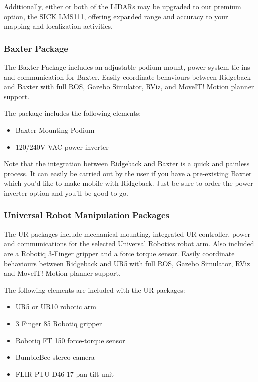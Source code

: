 \documentclass[]{clearpath-latex/clearpath-manual}
\begin{document}
Additionally, either or both of the LIDARs may be upgraded to our premium option, the SICK LMS111, offering expanded range and accuracy to your mapping and localization activities.

\subsubsection{Baxter Package}

The Baxter Package includes an adjustable podium mount, power system tie-ins and communication for Baxter. Easily coordinate behaviours between Ridgeback and Baxter with full ROS, Gazebo Simulator, RViz, and MoveIT! Motion planner support.

The package includes the following elements:

\begin{itemize}[nolistsep]
	\item Baxter Mounting Podium
	\item 120/240V VAC power inverter
\end{itemize}

Note that the integration between Ridgeback and Baxter is a quick and painless process. It can easily be carried out by the user if you have a pre-existing Baxter which you'd like to make mobile with Ridgeback. Just be sure to order the power inverter option and you'll be good to go.

\subsubsection{Universal Robot Manipulation Packages}

The UR packages include mechanical mounting, integrated UR controller, power and communications for the selected Universal Robotics robot arm. Also included are a Robotiq 3-Finger gripper and a force torque sensor. Easily coordinate behaviours between Ridgeback and UR5 with full ROS, Gazebo Simulator, RViz and MoveIT! Motion planner support.

The following elements are included with the UR packages:

\begin{itemize}[nolistsep]
	\item UR5 or UR10 robotic arm
	\item 3 Finger 85 Robotiq gripper
	\item Robotiq FT 150 force-torque sensor
	\item BumbleBee stereo camera
	\item FLIR PTU D46-17 pan-tilt unit
\end{itemize}
\end{document}
